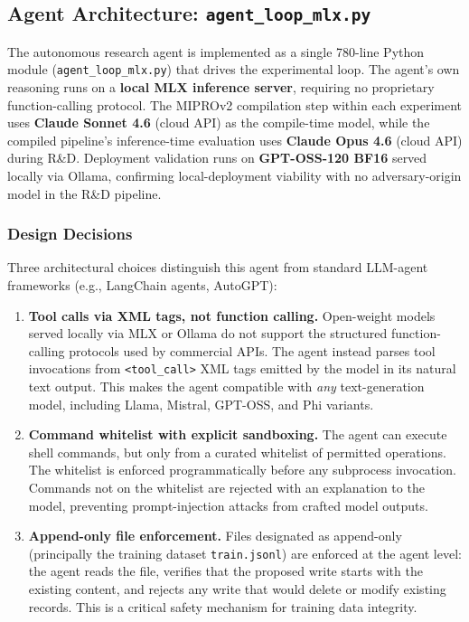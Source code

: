 \documentclass[11pt]{article}
\begin{document}
\subsection{Agent Architecture: \texttt{agent\_loop\_mlx.py}}

The autonomous research agent is implemented as a single 780-line Python
module (\texttt{agent\_loop\_mlx.py}) that drives the experimental loop.
The agent's own reasoning runs on a \textbf{local MLX inference server},
requiring no proprietary function-calling protocol. The MIPROv2 compilation
step within each experiment uses \textbf{Claude Sonnet 4.6} (cloud API)
as the compile-time model, while the compiled pipeline's inference-time
evaluation uses \textbf{Claude Opus 4.6} (cloud API) during R\&D.
Deployment validation runs on \textbf{GPT-OSS-120 BF16} served locally
via Ollama, confirming local-deployment viability with no adversary-origin
model in the R\&D pipeline.

\subsubsection{Design Decisions}

Three architectural choices distinguish this agent from standard
LLM-agent frameworks (e.g., LangChain agents, AutoGPT):

\begin{enumerate}[leftmargin=2em]
  \item \textbf{Tool calls via XML tags, not function calling.}
  Open-weight models served locally via MLX or Ollama do not support
  the structured function-calling protocols used by commercial APIs.
  The agent instead parses tool invocations from \texttt{<tool\_call>}
  XML tags emitted by the model in its natural text output. This makes
  the agent compatible with \emph{any} text-generation model,
  including Llama, Mistral, GPT-OSS, and Phi variants.

  \item \textbf{Command whitelist with explicit sandboxing.}
  The agent can execute shell commands, but only from a curated whitelist
  of permitted operations. The whitelist is enforced programmatically
  before any subprocess invocation. Commands not on the whitelist are
  rejected with an explanation to the model, preventing prompt-injection
  attacks from crafted model outputs.

  \item \textbf{Append-only file enforcement.}
  Files designated as append-only (principally the training dataset
  \texttt{train.jsonl}) are enforced at the agent level: the agent reads
  the file, verifies that the proposed write starts with the existing
  content, and rejects any write that would delete or modify existing
  records. This is a critical safety mechanism for training data
  integrity.
\end{enumerate}
\end{document}
